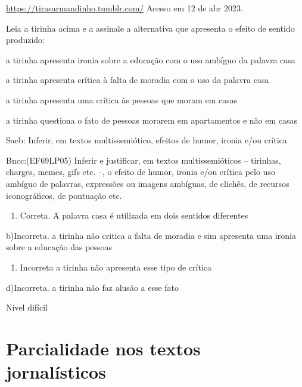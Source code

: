 {{\href{https://tirasarmandinho.tumblr.com/}{\uline{https://tirasarmandinho.tumblr.com/}}
Acesso em 12 de abr 2023.

Leia a tirinha acima e a assinale a alternativa que apresenta o efeito
de sentido produzido:

\begin{escolha}

\item
  a tirinha apresenta ironia sobre a educação com o uso ambíguo da
  palavra casa
\item
  a tirinha apresenta crítica à falta de moradia com o uso da palavra
  casa
\item
  a tirinha apresenta uma crítica às pessoas que moram em casas
\item
  a tirinha questiona o fato de pessoas morarem em apartamentos e não em
  casas
\end{escolha}

Saeb: Inferir, em textos multissemiótico, efeitos de humor, ironia e/ou
crítica

Bncc:(EF69LP05) Inferir e justificar, em textos multissemióticos --
tirinhas, charges, memes, gifs etc. --, o efeito de humor, ironia e/ou
crítica pelo uso ambíguo de palavras, expressões ou imagens ambíguas, de
clichês, de recursos iconográficos, de pontuação etc.

\begin{enumerate}
\def\labelenumi{\arabic{enumi}.}
\tightlist
\item
  Correta. A palavra casa é utilizada em dois sentidos diferentes
\end{enumerate}

b)Incorreta. a tirinha não critica a falta de moradia e sim apresenta
uma ironia sobre a educação das pessoas

\begin{enumerate}
\def\labelenumi{\arabic{enumi}.}
\tightlist
\item
  Incorreta a tirinha não apresenta esse tipo de crítica
\end{enumerate}

d)Incorreta. a tirinha não faz alusão a esse fato

Nível difícil


\chapter{Parcialidade nos textos jornalísticos}


}}
